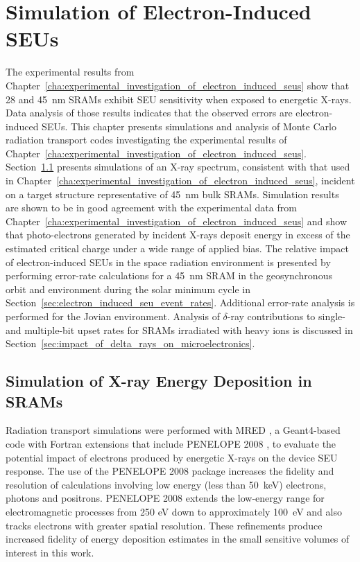\chapter{Simulation of Electron-Induced SEUs} %
\label{ch:simulation_of_electron_induced_seus}
The experimental results from Chapter~\ref{cha:experimental_investigation_of_electron_induced_seus} show that 28 and 45~nm SRAMs exhibit SEU sensitivity when exposed to energetic X-rays. 
Data analysis of those results indicates that the observed errors are electron-induced SEUs.
This chapter presents simulations and analysis of Monte Carlo radiation transport codes investigating the experimental results of Chapter~\ref{cha:experimental_investigation_of_electron_induced_seus}.
Section~\ref{sec:simulation_of_x_ray_energy_deposition_in_srams} presents simulations of an X-ray spectrum, consistent with that used in Chapter~\ref{cha:experimental_investigation_of_electron_induced_seus}, incident on a target structure representative of 45~nm bulk SRAMs.
Simulation results are shown to be in good agreement with the experimental data from Chapter~\ref{cha:experimental_investigation_of_electron_induced_seus} and show that photo-electrons generated by incident X-rays deposit energy in excess of the estimated critical charge under a wide range of applied bias.
The relative impact of electron-induced SEUs in the space radiation environment is presented by performing error-rate calculations for a 45~nm SRAM in the geosynchronous orbit and environment during the solar minimum cycle in Section~\ref{sec:electron_induced_seu_event_rates}.
Additional error-rate analysis is performed for the Jovian environment.
Analysis of $\delta$-ray contributions to single- and multiple-bit upset rates for SRAMs irradiated with heavy ions is discussed in Section~\ref{sec:impact_of_delta_rays_on_microelectronics}.

\section{Simulation of X-ray Energy Deposition in SRAMs} %
\label{sec:simulation_of_x_ray_energy_deposition_in_srams}
Radiation transport simulations were performed with MRED \cite{Weller:2010ud}, a Geant4-based code \cite{Agostinelli:2003vd} with Fortran extensions that include PENELOPE 2008 \cite{Salvat:ue}, to evaluate the potential impact of electrons produced by energetic X-rays on the device SEU response. 
The use of the PENELOPE 2008 package \cite{Salvat:ue} increases the fidelity and resolution of calculations involving low energy (less than 50~keV) electrons, photons and positrons.
PENELOPE 2008 extends the low-energy range for electromagnetic processes from 250 eV down to approximately 100~eV and also tracks electrons with greater spatial resolution. 
These refinements produce increased fidelity of energy deposition estimates in the small sensitive volumes of interest in this work.

